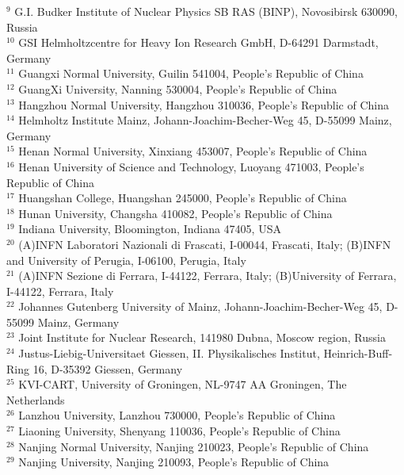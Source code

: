 {\begin{small}
\begin{center}
{$^{9}$ G.I. Budker Institute of Nuclear Physics SB RAS (BINP), Novosibirsk 630090, Russia\\
$^{10}$ GSI Helmholtzcentre for Heavy Ion Research GmbH, D-64291 Darmstadt, Germany\\
$^{11}$ Guangxi Normal University, Guilin 541004, People's Republic of China\\
$^{12}$ GuangXi University, Nanning 530004, People's Republic of China\\
$^{13}$ Hangzhou Normal University, Hangzhou 310036, People's Republic of China\\
$^{14}$ Helmholtz Institute Mainz, Johann-Joachim-Becher-Weg 45, D-55099 Mainz, Germany\\
$^{15}$ Henan Normal University, Xinxiang 453007, People's Republic of China\\
$^{16}$ Henan University of Science and Technology, Luoyang 471003, People's Republic of China\\
$^{17}$ Huangshan College, Huangshan 245000, People's Republic of China\\
$^{18}$ Hunan University, Changsha 410082, People's Republic of China\\
$^{19}$ Indiana University, Bloomington, Indiana 47405, USA\\
$^{20}$ (A)INFN Laboratori Nazionali di Frascati, I-00044, Frascati, Italy; (B)INFN and University of Perugia, I-06100, Perugia, Italy\\
$^{21}$ (A)INFN Sezione di Ferrara, I-44122, Ferrara, Italy; (B)University of Ferrara, I-44122, Ferrara, Italy\\
$^{22}$ Johannes Gutenberg University of Mainz, Johann-Joachim-Becher-Weg 45, D-55099 Mainz, Germany\\
$^{23}$ Joint Institute for Nuclear Research, 141980 Dubna, Moscow region, Russia\\
$^{24}$ Justus-Liebig-Universitaet Giessen, II. Physikalisches Institut, Heinrich-Buff-Ring 16, D-35392 Giessen, Germany\\
$^{25}$ KVI-CART, University of Groningen, NL-9747 AA Groningen, The Netherlands\\
$^{26}$ Lanzhou University, Lanzhou 730000, People's Republic of China\\
$^{27}$ Liaoning University, Shenyang 110036, People's Republic of China\\
$^{28}$ Nanjing Normal University, Nanjing 210023, People's Republic of China\\
$^{29}$ Nanjing University, Nanjing 210093, People's Republic of China\\
}
\end{center}
\end{small}}
